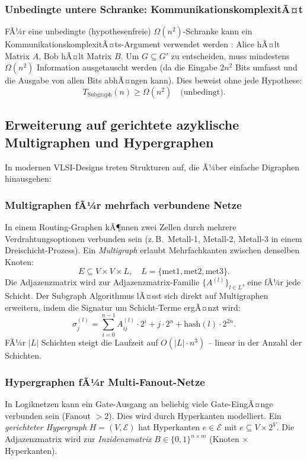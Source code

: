 ﻿\documentclass[a4paper,12pt]{article}
\theoremstyle{definition}
\begin{document}
\subsubsection{Unbedingte untere Schranke: KommunikationskomplexitÃ¤t}

FÃ¼r eine unbedingte (hypothesenfreie) $\Omega(n^2)$-Schranke kann ein
KommunikationskomplexitÃ¤ts-Argument verwendet werden \cite{kushilevitz1997communication}:
Alice hÃ¤lt Matrix $A$, Bob hÃ¤lt Matrix $B$. Um $G \subseteq G'$ zu entscheiden, muss
mindestens $\Omega(n^2)$ Information ausgetauscht werden (da die Eingabe $2n^2$ Bits
umfasst und die Ausgabe von allen Bits abhÃ¤ngen kann). Dies beweist ohne jede Hypothese:
\[
  T_{\text{Subgraph}}(n) \geq \Omega(n^2) \quad \text{(unbedingt)}.
\]

\subsection{Erweiterung auf gerichtete azyklische Multigraphen und Hypergraphen}

In modernen VLSI-Designs treten Strukturen auf, die Ã¼ber einfache Digraphen
hinausgehen:

\subsubsection{Multigraphen fÃ¼r mehrfach verbundene Netze}

In einem Routing-Graphen kÃ¶nnen zwei Zellen durch mehrere Verdrahtungsoptionen
verbunden sein (z.\,B.\ Metall-1, Metall-2, Metall-3 in einem Dreischicht-Prozess).
Ein \emph{Multigraph} erlaubt Mehrfachkanten zwischen denselben Knoten:
\[
  E \subseteq V \times V \times L, \quad L = \{\text{met1}, \text{met2}, \text{met3}\}.
\]
Die Adjazenzmatrix wird zur Adjazenzmatrix-Familie $\{A^{(l)}\}_{l \in L}$, eine fÃ¼r
jede Schicht. Der Subgraph Algorithmus lÃ¤sst sich direkt auf Multigraphen erweitern,
indem die Signatur um Schicht-Terme ergÃ¤nzt wird:
\[
  \sigma_j^{(l)} = \sum_{i=0}^{n-1} A_{ij}^{(l)} \cdot 2^i + j \cdot 2^n + \text{hash}(l) \cdot 2^{2n}.
\]
FÃ¼r $|L|$ Schichten steigt die Laufzeit auf $O(|L| \cdot n^3)$ -- linear in der Anzahl
der Schichten.

\subsubsection{Hypergraphen fÃ¼r Multi-Fanout-Netze}

In Logiknetzen kann ein Gate-Ausgang an beliebig viele Gate-EingÃ¤nge verbunden sein
(Fanout $> 2$). Dies wird durch Hyperkanten modelliert. Ein
\emph{gerichteter Hypergraph} $H = (V, \mathcal{E})$ hat Hyperkanten
$e \in \mathcal{E}$ mit $e \subseteq V \times 2^V$. Die Adjazenzmatrix wird zur
\emph{Inzidenzmatrix} $B \in \{0,1\}^{n \times m}$ (Knoten $\times$ Hyperkanten).
\end{document}
